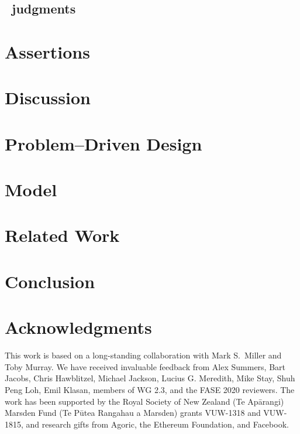 \documentclass[acmsmall]{acmart}
\newcommand{\susan}[1]{#1} %
\begin{document}
\subsection{\Chainmail\ judgments}
\label{sect:overviewmodel}


\section{Assertions}
\label{sect:assertions}




\section{Discussion}
\label{sect:discussion} 


\section{Problem--Driven Design}
\label{sect:problemdriven} 


\section{Model}
\label{sect:model}


\section{Related Work}
\label{sect:related}


\section{Conclusion}
\label{sect:conclusion}


\section{Acknowledgments}

This work is based on a long-standing collaboration with Mark
  S.\ Miller and Toby Murray.
We have received invaluable feedback from Alex Summers, Bart Jacobs,  Chris Hawblitzel,
Michael Jackson, Lucius G. Meredith,
Mike Stay, Shuh Peng Loh,  Emil Klasan, members of WG 2.3, 
and the FASE 2020  reviewers.
The work has been supported by the 
Royal Society of New Zealand (Te Ap\={a}rangi) Marsden Fund (Te P\={u}tea Rangahau a Marsden)
grants VUW-1318 and VUW-1815, and research gifts from Agoric\susan{, the Ethereum Foundation,} and
Facebook. 
\end{document}
